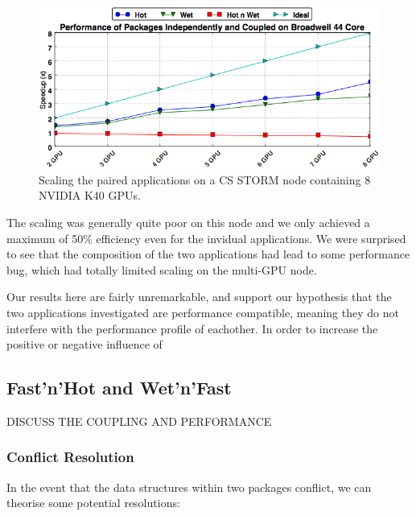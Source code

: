 \documentclass[runningheads,a4paper]{llncs}
\begin{document}
\begin{figure}
  \centering
  \includegraphics[width=1.0\linewidth]{gpu_storm}
  \caption{Scaling the paired applications on a CS STORM node containing 8 NVIDIA K40 GPUs.}
  \label{fig:scaling-hot-wet-storm}
\end{figure}

The scaling was generally quite poor on this node and we only achieved a maximum of 50\% efficiency even for the invidual applications. We were surprised to see that the composition of the two applications had lead to some performance bug, which had totally limited scaling on the multi-GPU node.


Our results here are fairly unremarkable, and support our hypothesis that the two applications investigated are performance compatible, meaning they do not interfere with the performance profile of eachother. In order to increase the positive or negative influence of 

\subsection{Fast'n'Hot and Wet'n'Fast}

DISCUSS THE COUPLING AND PERFORMANCE

\subsubsection{Conflict Resolution}

In the event that the data structures within two packages conflict, we can theorise some potential resolutions:
\end{document}
